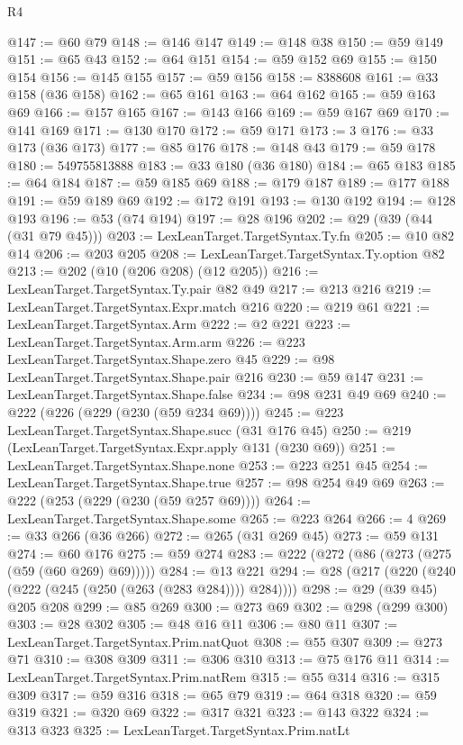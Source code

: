 \begin{lexlean}{R4}
\begin{coremodule}
@147 := @60 @79
@148 := @146 @147
@149 := @148 @38
@150 := @59 @149
@151 := @65 @43
@152 := @64 @151
@154 := @59 @152 @69
@155 := @150 @154
@156 := @145 @155
@157 := @59 @156
@158 := 8388608
@161 := @33 @158 (@36 @158)
@162 := @65 @161
@163 := @64 @162
@165 := @59 @163 @69
@166 := @157 @165
@167 := @143 @166
@169 := @59 @167 @69
@170 := @141 @169
@171 := @130 @170
@172 := @59 @171
@173 := 3
@176 := @33 @173 (@36 @173)
@177 := @85 @176
@178 := @148 @43
@179 := @59 @178
@180 := 549755813888
@183 := @33 @180 (@36 @180)
@184 := @65 @183
@185 := @64 @184
@187 := @59 @185 @69
@188 := @179 @187
@189 := @177 @188
@191 := @59 @189 @69
@192 := @172 @191
@193 := @130 @192
@194 := @128 @193
@196 := @53 (@74 @194)
@197 := @28 @196
@202 := @29 (@39 (@44 (@31 @79 @45)))
@203 := LexLeanTarget.TargetSyntax.Ty.fn
@205 := @10 @82 @14
@206 := @203 @205
@208 := LexLeanTarget.TargetSyntax.Ty.option @82
@213 := @202 (@10 (@206 @208) (@12 @205))
@216 := LexLeanTarget.TargetSyntax.Ty.pair @82 @49
@217 := @213 @216
@219 := LexLeanTarget.TargetSyntax.Expr.match @216
@220 := @219 @61
@221 := LexLeanTarget.TargetSyntax.Arm
@222 := @2 @221
@223 := LexLeanTarget.TargetSyntax.Arm.arm
@226 := @223 LexLeanTarget.TargetSyntax.Shape.zero @45
@229 := @98 LexLeanTarget.TargetSyntax.Shape.pair @216
@230 := @59 @147
@231 := LexLeanTarget.TargetSyntax.Shape.false
@234 := @98 @231 @49 @69
@240 := @222 (@226 (@229 (@230 (@59 @234 @69))))
@245 := @223 LexLeanTarget.TargetSyntax.Shape.succ (@31 @176 @45)
@250 := @219 (LexLeanTarget.TargetSyntax.Expr.apply @131 (@230 @69))
@251 := LexLeanTarget.TargetSyntax.Shape.none
@253 := @223 @251 @45
@254 := LexLeanTarget.TargetSyntax.Shape.true
@257 := @98 @254 @49 @69
@263 := @222 (@253 (@229 (@230 (@59 @257 @69))))
@264 := LexLeanTarget.TargetSyntax.Shape.some
@265 := @223 @264
@266 := 4
@269 := @33 @266 (@36 @266)
@272 := @265 (@31 @269 @45)
@273 := @59 @131
@274 := @60 @176
@275 := @59 @274
@283 := @222 (@272 (@86 (@273 (@275 (@59 (@60 @269) @69)))))
@284 := @13 @221
@294 := @28 (@217 (@220 (@240 (@222 (@245 (@250 (@263 (@283 @284)))) @284))))
@298 := @29 (@39 @45) @205 @208
@299 := @85 @269
@300 := @273 @69
@302 := @298 (@299 @300)
@303 := @28 @302
@305 := @48 @16 @11
@306 := @80 @11
@307 := LexLeanTarget.TargetSyntax.Prim.natQuot
@308 := @55 @307
@309 := @273 @71
@310 := @308 @309
@311 := @306 @310
@313 := @75 @176 @11
@314 := LexLeanTarget.TargetSyntax.Prim.natRem
@315 := @55 @314
@316 := @315 @309
@317 := @59 @316
@318 := @65 @79
@319 := @64 @318
@320 := @59 @319
@321 := @320 @69
@322 := @317 @321
@323 := @143 @322
@324 := @313 @323
@325 := LexLeanTarget.TargetSyntax.Prim.natLt

\end{coremodule}
\end{lexlean}
